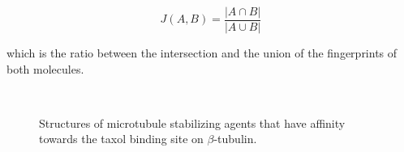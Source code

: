 \documentclass[11pt]{report}
\begin{document}
\begin{equation}
J(A,B) = \frac{|A \cap B|}{|A \cup B|}
\label{eq:T}
\end{equation}

which is the ratio between the intersection and the union of the fingerprints
of both molecules.

\begin{figure}[h]
\centering
{}
\hspace{0.2cm}
\hspace{0.2cm}
\\
\hspace{0.2cm}
\caption[Structures of microtubule stabilizing agents]{Structures of microtubule stabilizing agents that have affinity towards the taxol binding site on $\beta$-tubulin.}
\label{f:VS-MSAs}
\end{figure}
\end{document}
